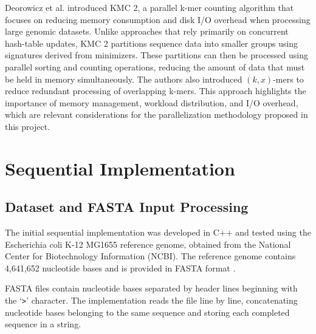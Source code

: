 \documentclass{article}
\begin{document}
\vspace{\baselineskip}

Deorowicz et al. \cite{deorowicz2015kmc2} introduced KMC 2, a parallel k-mer counting algorithm that focuses on reducing memory 
consumption and disk I/O overhead when processing large genomic datasets. Unlike approaches that rely primarily on concurrent hash-table 
updates, KMC 2 partitions sequence data into smaller groups using signatures derived from minimizers. These partitions can then be processed 
using parallel sorting and counting operations, reducing the amount of data that must be held in memory simultaneously. The authors also 
introduced $(k,x)$-mers to reduce redundant processing of overlapping k-mers. This approach highlights the importance of memory management, 
workload distribution, and I/O overhead, which are relevant considerations for the parallelization methodology proposed in this project.



\section{Sequential Implementation}

\vspace{\baselineskip}

\subsection{Dataset and FASTA Input Processing}

\vspace{\baselineskip}

The initial sequential implementation was developed in C++ and tested using the Escherichia coli 
K-12 MG1655 reference genome, obtained from the National Center for Biotechnology Information (NCBI).
The reference genome contains 4,641,652 nucleotide bases and is provided in FASTA format \cite{ncbi_ecoli}.

\vspace{\baselineskip}

FASTA files contain nucleotide bases separated by header lines beginning with the `\texttt{>}' character.
The implementation reads the file line by line, concatenating nucleotide bases belonging to the same sequence
and storing each completed sequence in a string.

\vspace{\baselineskip}
\end{document}
